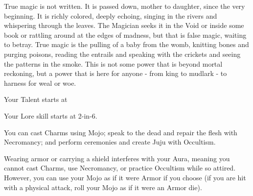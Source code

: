{  
  \setcounter{footnote}{0}
  \newpage
  


  True magic is not written. It is passed down, mother to daughter, since the very beginning.  It is richly colored, deeply echoing, singing in the rivers and whispering through the leaves.  The Magician seeks it in the Void or inside some book or rattling around at the edges of madness, but that is false magic, waiting to betray.  True magic is the pulling of a baby from the womb, knitting bones and purging poisons, reading the entrails and speaking with the crickets and seeing the patterns in the smoke.  This is not some power that is beyond mortal reckoning, but a power that is here for anyone - from king to mudlark - to harness for weal or woe.


  Your Talent starts at \DCUP

  Your Lore skill starts at 2-in-6. 

  \footnotemark
  You can cast Charms using Mojo; speak to the dead and repair the flesh with Necromancy; and perform ceremonies and create Juju with Occultism.  

  \footnotemark[\value{footnote}]
  Wearing armor or carrying a shield interferes with your Aura, meaning you cannot cast Charms, use Necromancy, or practice Occultism while so attired.  However, you can use your Mojo as if it were Armor if you choose (if you are hit with a physical attack, roll your Mojo \UD as if it were an Armor die).


}
